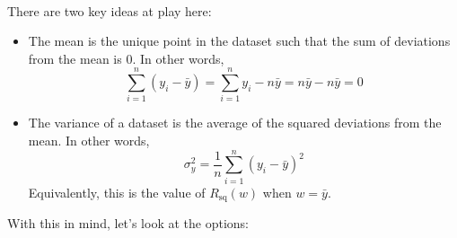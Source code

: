 \documentclass[11pt]{article}
\begin{document}
\begin{prob}[(16 pts)]
\begin{subprob}
 \\
 \\
 \\
 \\
 \\
 \\

\begin{solution}

There are two key ideas at play here:
\begin{itemize}
    \item The mean is the unique point in the dataset such that the sum of deviations from the mean is 0. In other words, $$\sum_{i=1}^n (y_i - \bar y) = \sum_{i=1}^n y_i - n \bar y = n \bar y - n \bar y = 0$$
    \item The variance of a dataset is the average of the squared deviations from the mean. In other words, $$\sigma_y^2 = \frac{1}{n} \sum_{i=1}^n (y_i - \bar y)^2$$
    Equivalently, this is the value of $R_\text{sq}(w)$ when $w = \bar y$.
\end{itemize}

With this in mind, let's look at the options:


\end{solution}
\end{subprob}
\end{prob}
\end{document}
